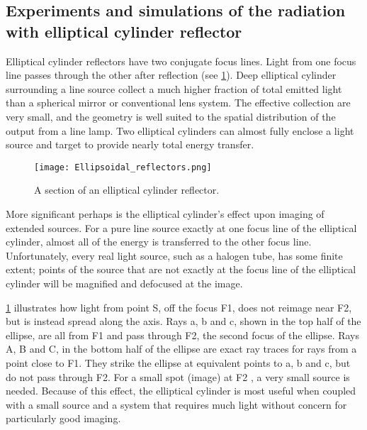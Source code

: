 \subsection{Experiments and simulations of the radiation with elliptical cylinder reflector}
\noindent
Elliptical cylinder reflectors have two conjugate focus lines. Light from one focus line passes through the other after reflection (see \ref{Fig:EllipsoidalReflectors}).
Deep elliptical cylinder surrounding a line source collect a much higher fraction of total emitted light than a spherical mirror or conventional lens system.
The effective collection are very small, and the geometry is well suited to the spatial distribution of the output from a line lamp.
Two elliptical cylinders can almost fully enclose a light source and target to provide nearly total energy transfer.
\begin{figure}[!htp]
	\centering
	\texttt{[image: Ellipsoidal\_reflectors.png]}
	\caption{A section of an elliptical cylinder reflector. }
	\label{Fig:EllipsoidalReflectors}
\end{figure}
More significant perhaps is the elliptical cylinder's effect upon imaging of extended sources.
For a pure line source exactly at one focus line of the elliptical cylinder, almost all of the energy is transferred to the other focus line.
Unfortunately, every real light source, such as a halogen tube, has some finite extent; points of the source that are not exactly at the focus line of the elliptical cylinder will be magnified and defocused at the image.

\ref{Fig:EllipsoidalReflectors} illustrates how light from point S, off the focus F1, does not reimage near F2, but is instead spread along the axis.
Rays a, b and c, shown in the top half of the ellipse, are all from F1 and pass through F2, the second focus of the ellipse. Rays A, B and C, in the bottom half of the ellipse are exact ray traces for rays from a point close to F1. They strike the ellipse at equivalent points to a, b and c, but do not pass through F2. For a small spot (image) at F2 , a very small source is needed.
Because of this effect, the elliptical cylinder is most useful when coupled with a small source and a system that requires much light without concern for particularly good imaging.


